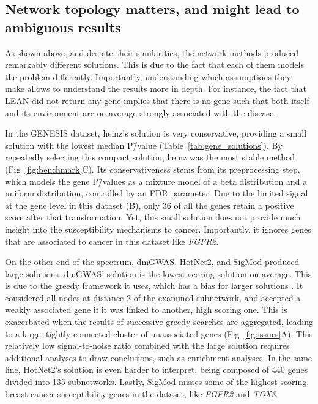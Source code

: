 \documentclass[10pt,letterpaper]{article}
\begin{document}
\subsection{Network topology matters, and might lead to ambiguous results}
\label{results:drawbacks}

As shown above, and despite their similarities, the network methods produced remarkably different solutions. This is due to the fact that each of them models the problem differently. Importantly, understanding which assumptions they make allows to understand the results more in depth. For instance, the fact that LEAN did not return any gene implies that there is no gene such that both itself and its environment are on average strongly associated with the disease.

In the GENESIS dataset, heinz's solution is very conservative, providing a small solution with the lowest median P\=/value (Table~\ref{tab:gene_solutions}). By repeatedly selecting this compact solution, heinz was the most stable method (Fig~\ref{fig:benchmark}C). Its conservativeness stems from its preprocessing step, which models the gene P\=/values as a mixture model of a beta distribution and a uniform distribution, controlled by an FDR parameter. Due to the limited signal at the gene level in this dataset (B), only 36 of all the genes retain a positive score after that transformation. Yet, this small solution does not provide much insight into the susceptibility mechanisms to cancer. Importantly, it ignores genes that are associated to cancer in this dataset like \emph{FGFR2}. 

On the other end of the spectrum, dmGWAS, HotNet2, and SigMod produced large solutions. dmGWAS' solution is the lowest scoring solution on average. This is due to the greedy framework it uses, which has a bias for larger solutions \cite{nikolayeva_network_2018}. It considered all nodes at distance 2 of the examined subnetwork, and accepted a weakly associated gene if it was linked to another, high scoring one. This is exacerbated when the results of successive greedy searches are aggregated, leading to a large, tightly connected cluster of unassociated genes (Fig~\ref{fig:issues}A). This relatively low signal-to-noise ratio combined with the large solution requires additional analyses to draw conclusions, such as enrichment analyses. In the same line, HotNet2's solution is even harder to interpret, being composed of 440 genes divided into 135 subnetworks. Lastly, SigMod misses some of the highest scoring, breast cancer susceptibility genes in the dataset, like \emph{FGFR2} and \emph{TOX3}.
\end{document}
